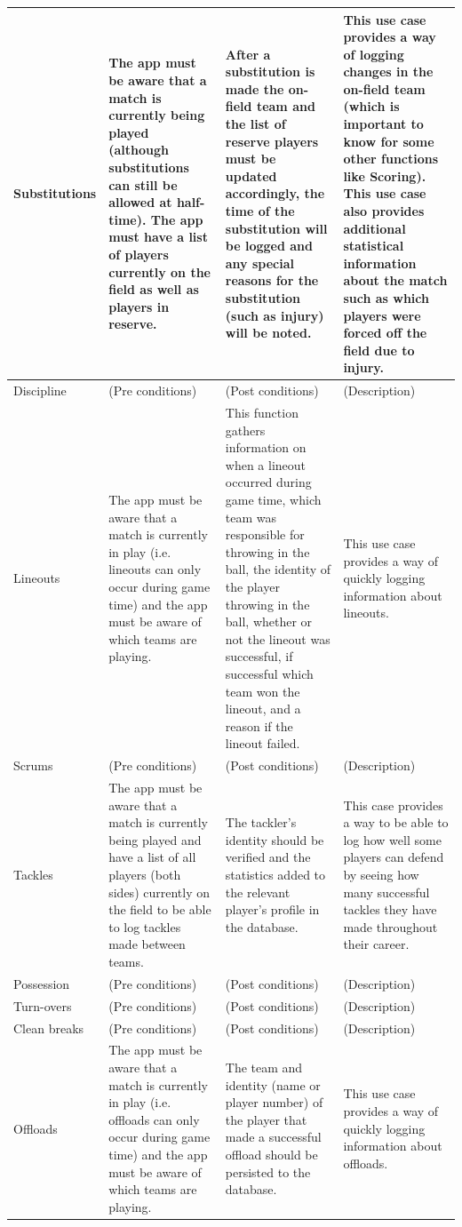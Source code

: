 \documentclass[a4paper,12pt]{report}
\begin{document}
\begin{center}
\begin{longtable}{| p{3cm} | p{4cm} | p{4cm} | p{4cm} |}
    Substitutions & The app must be aware that a match is currently being played (although substitutions can still be allowed at half-time). The app must have a list of players currently on the field as well as players in reserve. & After a substitution is made the on-field team and the list of reserve players must be updated accordingly, the time of the substitution will be logged and any special reasons for the substitution (such as injury) will be noted. & This use case provides a way of logging changes in the on-field team (which is important to know for some other functions like Scoring). This use case also provides additional statistical information about the match such as which players were forced off the field due to injury.\\ \hline
    Discipline & (Pre conditions) & (Post conditions) & (Description)\\ \hline
    Lineouts & The app must be aware that a match is currently in play (i.e. lineouts can only occur during game time) and the app must be aware of which teams are playing. & This function gathers information on when a lineout occurred during game time, which team was responsible for throwing in the ball, the identity of the player throwing in the ball, whether or not the lineout was successful, if successful which team won the lineout, and a reason if the lineout failed. & This use case provides a way of quickly logging information about lineouts.\\ \hline
    Scrums & (Pre conditions) & (Post conditions) & (Description)\\ \hline
    Tackles & The app must be aware that a match is currently being played and have a list of all players (both sides) currently on the field to be able to log tackles made between teams. & The tackler's identity should be verified and the statistics added to the relevant player's profile in the database. & This case provides a way to be able to log how well some players can defend by seeing how many successful tackles they have made throughout their career.\\ \hline
    Possession & (Pre conditions) & (Post conditions) & (Description)\\ \hline
    Turn-overs & (Pre conditions) & (Post conditions) & (Description)\\ \hline
    Clean breaks & (Pre conditions) & (Post conditions) & (Description)\\ \hline
    Offloads & The app must be aware that a match is currently in play (i.e. offloads can only occur during game time) and the app must be aware of which teams are playing. & The team and identity (name or player number) of the player that made a successful offload should be persisted to the database. & This use case provides a way of quickly logging information about offloads.\\ \hline

\end{longtable}
\end{center}
\end{document}
